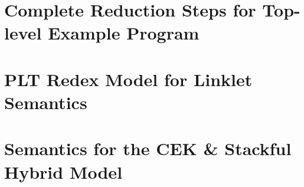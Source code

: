 \begin{appendices}
\chapter[\texorpdfstring{Complete Reduction Steps for Top-level Example Program}{Appendix B}]{Complete Reduction Steps for Top-level Example Program}
\label{appendix:formal-reduction-steps-toplevel-example}


\chapter[\texorpdfstring{PLT Redex Model for Linklet Semantics}{Appendix C}]{PLT Redex Model for Linklet Semantics}
\label{appendix:linklet-semantics-model-redex-code}


\chapter[\texorpdfstring{Semantics for the CEK \& Stackful Hybrid Model}
                          {Appendix D}]{Semantics for the CEK \& Stackful Hybrid Model}
\label{appendix:cek-stackful-redex}

    

    \clearpage




    \clearpage


\end{appendices}